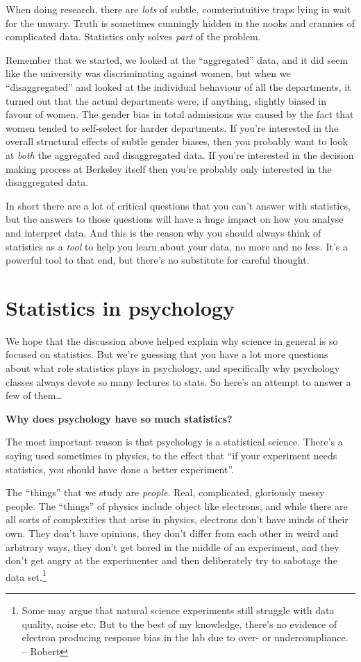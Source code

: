 \documentclass[
  11pt,
]{book}
\theoremstyle{definition}
\theoremstyle{definition}
\theoremstyle{definition}
\theoremstyle{definition}
\theoremstyle{remark}
\begin{document}
When doing research, there are \emph{lots} of subtle, counterintuitive traps lying in wait for the unwary. Truth is sometimes cunningly hidden in the nooks and crannies of complicated data. Statistics only solves \emph{part} of the problem.

Remember that we started, we looked at the ``aggregated'' data, and it did seem like the university was discriminating against women, but when we ``disaggregated'' and looked at the individual behaviour of all the departments, it turned out that the actual departments were, if anything, slightly biased in favour of women. The gender bias in total admissions was caused by the fact that women tended to self-select for harder departments. If you're interested in the overall structural effects of subtle gender biases, then you probably want to look at \emph{both} the aggregated and disaggregated data. If you're interested in the decision making process at Berkeley itself then you're probably only interested in the disaggregated data.

In short there are a lot of critical questions that you can't answer with statistics, but the answers to those questions will have a huge impact on how you analyse and interpret data. And this is the reason why you should always think of statistics as a \emph{tool} to help you learn about your data, no more and no less. It's a powerful tool to that end, but there's no substitute for careful thought.

\hypertarget{statistics-in-psychology}{%
\section{Statistics in psychology}\label{statistics-in-psychology}}

We hope that the discussion above helped explain why science in general is so focused on statistics. But we're guessing that you have a lot more questions about what role statistics plays in psychology, and specifically why psychology classes always devote so many lectures to stats. So here's an attempt to answer a few of them\ldots{}

\textbf{Why does psychology have so much statistics?}

The most important reason is that psychology is a statistical science. There's a saying used sometimes in physics, to the effect that ``if your experiment needs statistics, you should have done a better experiment''.

The ``things'' that we study are \emph{people}. Real, complicated, gloriously messy people. The ``things'' of physics include object like electrons, and while there are all sorts of complexities that arise in physics, electrons don't have minds of their own. They don't have opinions, they don't differ from each other in weird and arbitrary ways, they don't get bored in the middle of an experiment, and they don't get angry at the experimenter and then deliberately try to sabotage the data set.\footnote{Some may argue that natural science experiments still struggle with data quality, noise etc. But to the best of my knowledge, there's no evidence of electron producing response bias in the lab due to over- or undercompliance. -- Robert}
\end{document}
